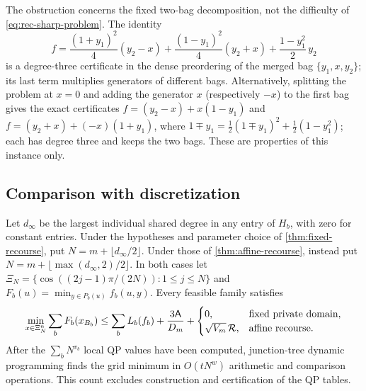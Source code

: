 \begin{remark}
\label{rem:merge-split}
The obstruction concerns the fixed two-bag decomposition, not the
difficulty of \eqref{eq:rec-sharp-problem}. The identity
\[
  f=\frac{(1+y_1)^2}4(y_2-x)+\frac{(1-y_1)^2}4(y_2+x)+\frac{1-y_1^2}2\,y_2
\]
is a degree-three certificate in the dense preordering of the merged bag
$\{y_1,x,y_2\}$; its last term multiplies generators of different bags.
Alternatively, splitting the problem at $x=0$ and adding the generator $x$
(respectively $-x$) to the first bag gives the exact certificates
$f=(y_2-x)+x(1-y_1)$ and $f=(y_2+x)+(-x)(1+y_1)$, where
$1\mp y_1=\tfrac12(1\mp y_1)^2+\tfrac12(1-y_1^2)$; each has degree three and
keeps the two bags. These are properties of this instance only.
\end{remark}

\subsection{Comparison with discretization}\label{sec:rec-grid}

\begin{corollary}
\label{cor:rec-grid}
Let $d_\infty$ be the largest individual shared degree in any entry of
$H_b$, with zero for constant entries. Under the hypotheses and parameter
choice of \cref{thm:fixed-recourse}, put
$N=m+\lfloor d_\infty/2\rfloor$. Under those of
\cref{thm:affine-recourse}, instead put
$N=m+\lfloor\max(d_\infty,2)/2\rfloor$. In both cases let
$\Xi_N=\{\cos((2j-1)\pi/(2N)):1\le j\le N\}$ and
$F_b(u)=\min_{y\in P_b(u)}f_b(u,y)$. Every feasible family satisfies
\[
 \min_{x\in\Xi_N^n}\sum_bF_b(x_{B_b})
 \le\sum_bL_b(f_b)+\frac{3\mathsf{A}}{D_m}
 +\begin{cases}0,&\text{fixed private domain},\\
               \sqrt{V_m}\,\mathcal R,&\text{affine recourse}.
   \end{cases}
\]
After the $\sum_bN^{v_b}$ local QP values have been computed, junction-tree
dynamic programming finds the grid minimum in $O(tN^w)$
arithmetic and comparison operations. This count excludes construction
and certification of the QP tables.
\end{corollary}

